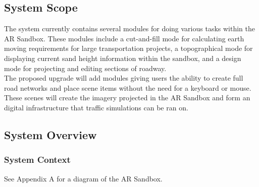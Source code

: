 \documentclass[letterpaper, 10pt, onecolumn, draftclsnofoot]{IEEEtran}
\begin{document}
    \subsection{\textbf{System Scope}}
        The system currently contains several modules for doing various tasks within the AR Sandbox. These modules include a cut-and-fill mode for calculating earth moving requirements for large transportation projects, a topographical mode for displaying current sand height information within the sandbox, and a design mode for projecting and editing sections of roadway.\\
        The proposed upgrade will add modules giving users the ability to create full road networks and place scene items without the need for a keyboard or mouse. These scenes will create the imagery projected in the AR Sandbox and form an digital infrastructure that traffic simulations can be ran on.
    
    \subsection{\textbf{System Overview}}
        \subsubsection{\textbf{System Context}}
        See Appendix A for a diagram of the AR Sandbox. 
        
\end{document}

